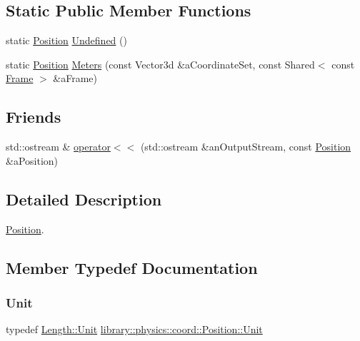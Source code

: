 \subsection*{Static Public Member Functions}
\begin{DoxyCompactItemize}
\item 
static \hyperlink{classlibrary_1_1physics_1_1coord_1_1_position}{Position} \hyperlink{classlibrary_1_1physics_1_1coord_1_1_position_a65f80401df5fa5c1eab7e3bdf1b8f8c5}{Undefined} ()
\item 
static \hyperlink{classlibrary_1_1physics_1_1coord_1_1_position}{Position} \hyperlink{classlibrary_1_1physics_1_1coord_1_1_position_a9ee5717230be48ee3f52e16383314ba0}{Meters} (const Vector3d \&a\+Coordinate\+Set, const Shared$<$ const \hyperlink{classlibrary_1_1physics_1_1coord_1_1_frame}{Frame} $>$ \&a\+Frame)
\end{DoxyCompactItemize}
\subsection*{Friends}
\begin{DoxyCompactItemize}
\item 
std\+::ostream \& \hyperlink{classlibrary_1_1physics_1_1coord_1_1_position_aab9f362c268370239ccad2c8a6d0eaee}{operator$<$$<$} (std\+::ostream \&an\+Output\+Stream, const \hyperlink{classlibrary_1_1physics_1_1coord_1_1_position}{Position} \&a\+Position)
\end{DoxyCompactItemize}


\subsection{Detailed Description}
\hyperlink{classlibrary_1_1physics_1_1coord_1_1_position}{Position}. 

\subsection{Member Typedef Documentation}
\mbox{\label{classlibrary_1_1physics_1_1coord_1_1_position_aa89cc8ffbcb33e1b347e51b179183613}} 
\subsubsection{\texorpdfstring{Unit}{Unit}}
{\footnotesize\ttfamily typedef \hyperlink{classlibrary_1_1physics_1_1units_1_1_length_a3b8b39cd245cf6b19dc34459baeccb18}{Length\+::\+Unit} \hyperlink{classlibrary_1_1physics_1_1units_1_1_length_a3b8b39cd245cf6b19dc34459baeccb18}{library\+::physics\+::coord\+::\+Position\+::\+Unit}}



